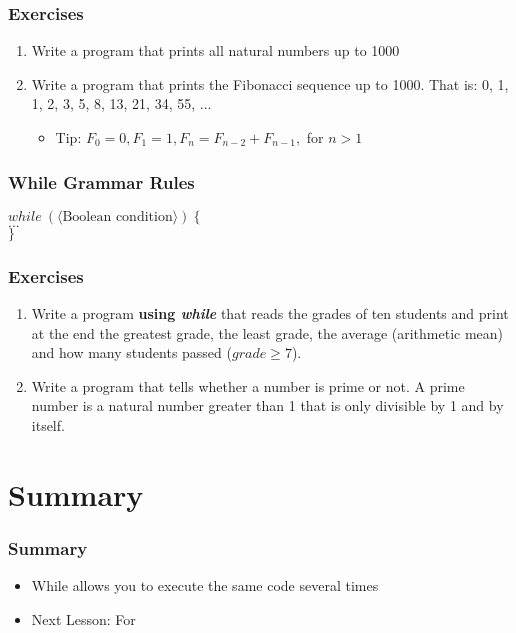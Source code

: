 \documentclass{beamer}
\newcommand{\cindent}{\hskip20pt}
\begin{document}
	\begin{frame}
		\frametitle{Exercises}
		\begin{enumerate}
			\item Write a program that prints all natural numbers up to 1000
			\pause
			\item Write a program that prints the Fibonacci sequence up to 1000. That is: 0, 1, 1, 2, 3, 5, 8, 13, 21, 34, 55, ... 
			\pause
			\begin{itemize}
				\item Tip: $F_0 = 0, F_1 = 1, F_n = F_{n-2} + F_{n-1},$ for $n > 1$
			\end{itemize}
		\end{enumerate}
	\end{frame}

	\begin{frame}
		\frametitle{While Grammar Rules}
		$while\ (\langle \text{Boolean condition} \rangle)\ \{$\\
			\cindent $...$\\
		$\}$\\
	\end{frame}

	\begin{frame}
		\frametitle{Exercises}
		\begin{enumerate}
			\item Write a program \textbf{using \emph{while}} that reads the grades of ten students and print at the end the greatest grade, the least grade, the average (arithmetic mean) and how many students passed ($grade \ge 7$).
			\pause
			\item Write a program that tells whether a number is prime or not. A prime number is a natural number greater than 1 that is only divisible by 1 and by itself.
		\end{enumerate}
	\end{frame}
		
	\section{Summary}
	
	\begin{frame}
		\frametitle{Summary}
		\begin{itemize}
			\item While allows you to execute the same code several times
			\item Next Lesson: For
		\end{itemize}
	\end{frame}
\end{document}
